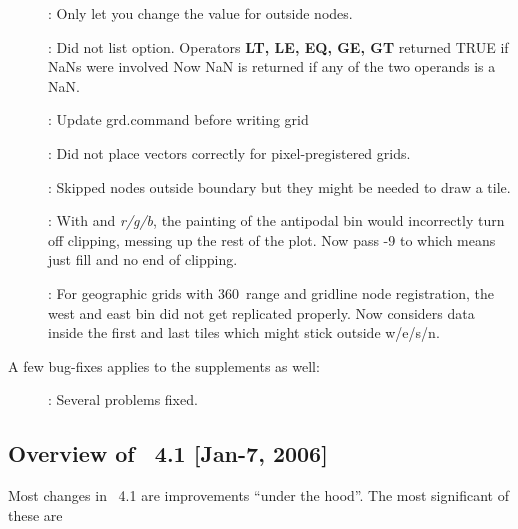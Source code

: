 \begin{description}
\item []: Only let you change the value for outside nodes.
\item []: Did not list  option.  Operators \textbf{LT, LE, EQ, GE, GT} returned TRUE if NaNs were involved
Now NaN is returned if any of the two operands is a NaN.
\item []: Update grd.command before writing grid
\item []: Did not place vectors correctly for pixel-pregistered grids.
\item []: Skipped nodes outside boundary but they might be needed to draw a tile.
\item []: With  and \emph{r/g/b}, the painting of the antipodal bin would incorrectly
turn off clipping, messing up the rest of the plot.  Now pass -9 to  which means just fill and no end of clipping.
\item []: For geographic grids with 360\DS\ range and gridline node registration,
the west and east bin did not get replicated properly.
Now considers data inside the first and last tiles which might stick outside w/e/s/n.
\end{description}
A few bug-fixes applies to the supplements as well:
\begin{description}
\item []: Several problems fixed.
\end{description}

\subsection{Overview of \gmt\ 4.1 [Jan-7, 2006]}

Most changes in \GMT\ 4.1 are improvements ``under the hood''.  The most significant of these are

